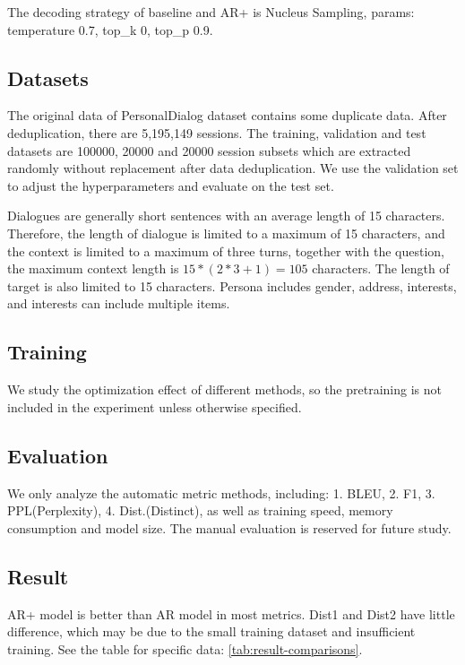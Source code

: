 \documentclass[letterpaper]{article} %
\DeclareRobustCommand{\citeext}[1]{\cite[#1]{#1}}
\begin{document}
The decoding strategy of baseline and AR+ is Nucleus Sampling\citeext{Holtzman2019}, params: temperature 0.7, top\_k 0, top\_p 0.9.

\subsection[Datasets]{Datasets} 
The original data of PersonalDialog\citeext{Zheng2019a} dataset contains some duplicate data. After deduplication, there are 5,195,149 sessions. The training, validation and test datasets are 100000, 20000 and 20000 session subsets which are extracted randomly without replacement after data deduplication. We use the validation set to adjust the hyperparameters and evaluate on the test set. 

Dialogues are generally short sentences with an average length of 15 characters. Therefore, the length of dialogue is limited to a maximum of 15 characters, and the context is limited to a maximum of three turns, together with the question, the maximum context length is $15*(2*3+1)=105$ characters. The length of target is also limited to 15 characters. Persona includes gender, address, interests, and interests can include multiple items. 

\subsection[Training]{Training}
We study the optimization effect of different methods, so the pretraining is not included in the experiment unless otherwise specified. 

\subsection[Evaluation]{Evaluation} 
We only analyze the automatic metric methods, including: 1. BLEU\citeext{Papineni2002}, 2. F1, 3. PPL(Perplexity), 4. Dist.(Distinct)\citeext{Li2016}, as well as training speed, memory consumption and model size. The manual evaluation is reserved for future study. 

\subsection[Result]{Result} 
AR+ model is better than AR model in most metrics. Dist1 and Dist2 have little difference, which may be due to the small training dataset and insufficient training. See the table for specific data: \ref{tab:result-comparisons}.
\end{document}

